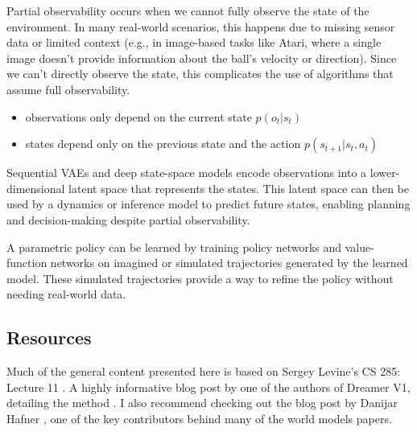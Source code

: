 \begin{enumerate}
\newline
Partial observability occurs when we cannot fully observe the state of the environment. In 
many real-world scenarios, this happens due to missing sensor data or limited context 
(e.g., in image-based tasks like Atari, where a single image doesn’t provide information 
about the ball's velocity or direction). Since we can't directly observe the state, this 
complicates the use of algorithms that assume full observability.

\begin{itemize}
    \item observations only depend on the current state $p(o_t|s_t)$
    \item states depend only on the previous state and the action $p(s_{t+1}|s_t,a_t)$
\end{itemize}

\newline

\newline
Sequential VAEs and deep state-space models encode observations into a lower-dimensional 
latent space that represents the states. This latent space can then be used by a dynamics 
or inference model to predict future states, enabling planning and decision-making despite 
partial observability.

\newline
A parametric policy can be learned by training policy networks and value-function networks 
on imagined or simulated trajectories generated by the learned model. These simulated 
trajectories provide a way to refine the policy without needing real-world data.

\end{enumerate}

\subsection{Resources}
Much of the general content presented here is based on Sergey Levine’s CS 285: Lecture 11 \cite{CS285,CS285LevineYoutube}. A 
highly informative blog post \cite{Dreamer_V1} by one of the authors of Dreamer V1, detailing the method . I also recommend 
checking out the blog post by Danijar Hafner \cite{danjar}, one of the key contributors behind many of the world models papers.
